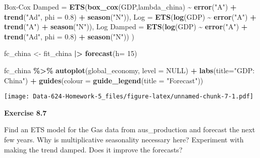 \documentclass[
]{article}
\newenvironment{Shaded}{\begin{snugshade}}{\end{snugshade}}
\newcommand{\AttributeTok}[1]{\textcolor[rgb]{0.13,0.29,0.53}{#1}}
\newcommand{\ConstantTok}[1]{\textcolor[rgb]{0.56,0.35,0.01}{#1}}
\newcommand{\DecValTok}[1]{\textcolor[rgb]{0.00,0.00,0.81}{#1}}
\newcommand{\FloatTok}[1]{\textcolor[rgb]{0.00,0.00,0.81}{#1}}
\newcommand{\FunctionTok}[1]{\textcolor[rgb]{0.13,0.29,0.53}{\textbf{#1}}}
\newcommand{\NormalTok}[1]{#1}
\newcommand{\OtherTok}[1]{\textcolor[rgb]{0.56,0.35,0.01}{#1}}
\newcommand{\SpecialCharTok}[1]{\textcolor[rgb]{0.81,0.36,0.00}{\textbf{#1}}}
\newcommand{\StringTok}[1]{\textcolor[rgb]{0.31,0.60,0.02}{#1}}
\begin{document}
\begin{Shaded}
\begin{Highlighting}[]
        \StringTok{\textasciigrave{}}\AttributeTok{Box{-}Cox Damped}\StringTok{\textasciigrave{}} \OtherTok{=} \FunctionTok{ETS}\NormalTok{(}\FunctionTok{box\_cox}\NormalTok{(GDP,lambda\_china) }\SpecialCharTok{\textasciitilde{}} \FunctionTok{error}\NormalTok{(}\StringTok{"A"}\NormalTok{) }\SpecialCharTok{+} \FunctionTok{trend}\NormalTok{(}\StringTok{"Ad"}\NormalTok{, }\AttributeTok{phi =} \FloatTok{0.8}\NormalTok{) }\SpecialCharTok{+} \FunctionTok{season}\NormalTok{(}\StringTok{"N"}\NormalTok{)),}
        \StringTok{\textasciigrave{}}\AttributeTok{Log}\StringTok{\textasciigrave{}} \OtherTok{=} \FunctionTok{ETS}\NormalTok{(}\FunctionTok{log}\NormalTok{(GDP) }\SpecialCharTok{\textasciitilde{}} \FunctionTok{error}\NormalTok{(}\StringTok{"A"}\NormalTok{) }\SpecialCharTok{+} \FunctionTok{trend}\NormalTok{(}\StringTok{"A"}\NormalTok{) }\SpecialCharTok{+} \FunctionTok{season}\NormalTok{(}\StringTok{"N"}\NormalTok{)),}
        \StringTok{\textasciigrave{}}\AttributeTok{Log Damped}\StringTok{\textasciigrave{}} \OtherTok{=} \FunctionTok{ETS}\NormalTok{(}\FunctionTok{log}\NormalTok{(GDP) }\SpecialCharTok{\textasciitilde{}} \FunctionTok{error}\NormalTok{(}\StringTok{"A"}\NormalTok{) }\SpecialCharTok{+} \FunctionTok{trend}\NormalTok{(}\StringTok{"Ad"}\NormalTok{, }\AttributeTok{phi =} \FloatTok{0.8}\NormalTok{) }\SpecialCharTok{+} \FunctionTok{season}\NormalTok{(}\StringTok{"N"}\NormalTok{))}
\NormalTok{  )}

\NormalTok{fc\_china }\OtherTok{\textless{}{-}}\NormalTok{ fit\_china }\SpecialCharTok{|\textgreater{}} \FunctionTok{forecast}\NormalTok{(}\AttributeTok{h=} \DecValTok{15}\NormalTok{)}

\NormalTok{fc\_china }\SpecialCharTok{\%\textgreater{}\%}
  \FunctionTok{autoplot}\NormalTok{(global\_economy, }\AttributeTok{level =} \ConstantTok{NULL}\NormalTok{) }\SpecialCharTok{+}
  \FunctionTok{labs}\NormalTok{(}\AttributeTok{title=}\StringTok{"GDP: China"}\NormalTok{) }\SpecialCharTok{+}
  \FunctionTok{guides}\NormalTok{(}\AttributeTok{colour =} \FunctionTok{guide\_legend}\NormalTok{(}\AttributeTok{title =} \StringTok{"Forecast"}\NormalTok{))}
\end{Highlighting}
\end{Shaded}

\texttt{[image: Data-624-Homework-5\_files/figure-latex/unnamed-chunk-7-1.pdf]}

\textbf{Exercise 8.7}

Find an ETS model for the Gas data from aus\_production and forecast the
next few years. Why is multiplicative seasonality necessary here?
Experiment with making the trend damped. Does it improve the forecasts?
\end{document}
